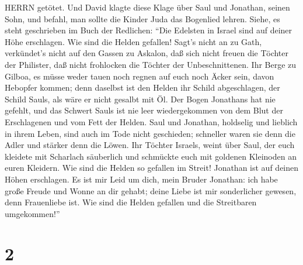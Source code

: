 HERRN getötet.  Und David klagte diese Klage über Saul und
Jonathan, seinen Sohn,  und befahl, man sollte die Kinder
Juda das Bogenlied lehren. Siehe, es steht geschrieben im Buch der
Redlichen:  ``Die Edelsten in Israel sind auf deiner Höhe
erschlagen. Wie sind die Helden gefallen!  Sagt's nicht an
zu Gath, verkündet's nicht auf den Gassen zu Askalon, daß sich nicht
freuen die Töchter der Philister, daß nicht frohlocken die Töchter der
Unbeschnittenen.  Ihr Berge zu Gilboa, es müsse weder tauen
noch regnen auf euch noch Äcker sein, davon Hebopfer kommen; denn
daselbst ist den Helden ihr Schild abgeschlagen, der Schild Sauls, als
wäre er nicht gesalbt mit Öl.  Der Bogen Jonathans hat nie
gefehlt, und das Schwert Sauls ist nie leer wiedergekommen von dem Blut
der Erschlagenen und vom Fett der Helden.  Saul und
Jonathan, holdselig und lieblich in ihrem Leben, sind auch im Tode nicht
geschieden; schneller waren sie denn die Adler und stärker denn die
Löwen.  Ihr Töchter Israels, weint über Saul, der euch
kleidete mit Scharlach säuberlich und schmückte euch mit goldenen
Kleinoden an euren Kleidern.  Wie sind die Helden so
gefallen im Streit! Jonathan ist auf deinen Höhen erschlagen.
 Es ist mir Leid um dich, mein Bruder Jonathan: ich habe
große Freude und Wonne an dir gehabt; deine Liebe ist mir sonderlicher
gewesen, denn Frauenliebe ist.  Wie sind die Helden
gefallen und die Streitbaren umgekommen!''

\hypertarget{section-1}{%
\section{2}\label{section-1}}

